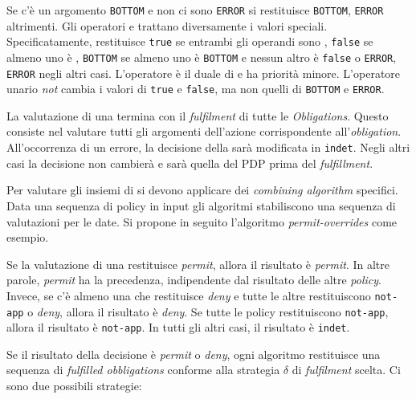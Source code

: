 Se c'è un argomento \texttt{BOTTOM} e non ci sono \texttt{ERROR} si restituisce \texttt{BOTTOM}, \texttt{ERROR} altrimenti.
Gli operatori \eand e \eor trattano diversamente i valori speciali. Specificatamente, \eand restituisce \texttt{true} se entrambi
gli operandi sono \etrue, \texttt{false} se almeno uno è \efalse, \texttt{BOTTOM} se almeno uno è \texttt{BOTTOM} e nessun altro è
\texttt{false} o \texttt{ERROR}, \texttt{ERROR} negli altri casi. L'operatore \eor è il duale di \eand e ha priorità minore.
L'operatore unario \emph{not} cambia i valori di \texttt{true} e \texttt{false}, ma non quelli di \texttt{BOTTOM} e \texttt{ERROR}.\par
La valutazione di una \epolicy termina con il \emph{fulfilment} di tutte le \emph{Obligations}. Questo consiste nel valutare
tutti gli argomenti dell'azione corrispondente all'\emph{obligation}. All'occorrenza di un errore, la decisione della \epolicy
sarà modificata in \texttt{indet}.
Negli altri casi la decisione non cambierà e sarà quella del \ac{PDP} prima del \emph{fulfillment}.\par
Per valutare gli insiemi di \epolicy si devono applicare dei \emph{combining algorithm} specifici. Data una sequenza di
policy in input gli algoritmi stabiliscono una sequenza di valutazioni per le \epolicy date. Si propone in seguito l'algoritmo
\emph{permit-overrides} come esempio.
\begin{description}[labelindent=5pt,style=multiline,leftmargin=3cm]
\item[permit-overrides]
                        Se la valutazione di una \epolicy restituisce \emph{permit}, allora il risultato è \emph{permit}.
                        In altre parole, \emph{permit} ha la precedenza, indipendente dal risultato delle altre \emph{policy}.
                        Invece, se c'è almeno una \epolicy che restituisce \emph{deny} e tutte le altre restituiscono
                        \texttt{not-app} o \emph{deny}, allora il risultato è \emph{deny}. Se tutte le policy restituiscono
                        \texttt{not-app}, allora il risultato è \texttt{not-app}. In tutti gli altri casi, il risultato è \texttt{indet}.
\end{description}
Se il risultato della decisione è \emph{permit} o \emph{deny}, ogni algoritmo restituisce una sequenza di \emph{fulfilled obbligations}
conforme alla strategia $\delta$ di \emph{fulfilment} scelta. Ci sono due possibili strategie:
